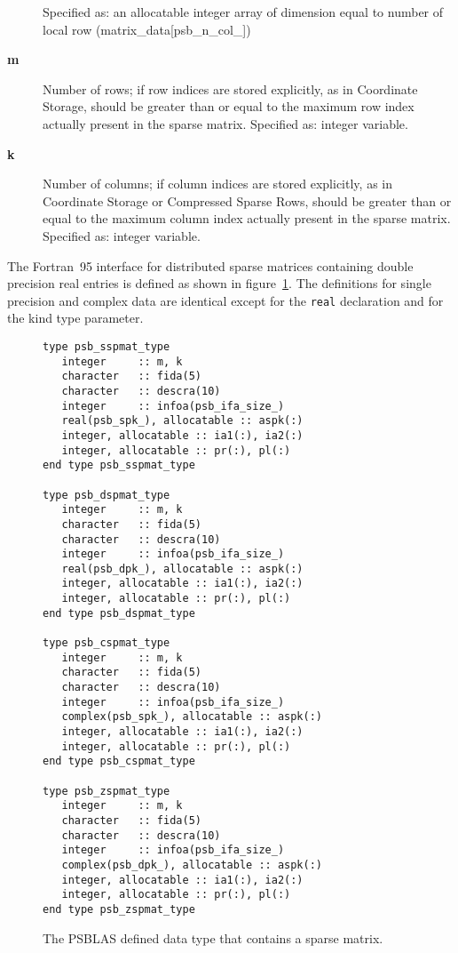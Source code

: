 \begin{description}
Specified as: an allocatable integer array of dimension equal to number of
local row (matrix\_data[psb\_n\_col\_\hbox{]})
\item[{\bf m}] Number of rows; if row indices are stored explicitly,
as in Coordinate Storage, should be greater than or equal to the
maximum row index actually present in the sparse matrix.
Specified as: integer variable.
\item[{\bf k}] Number of columns; if column indices are stored explicitly,
as in Coordinate Storage or Compressed Sparse Rows, should be greater
than or equal to the maximum column  index actually present in the sparse matrix.
Specified as: integer variable.
\end{description}
The Fortran~95 interface for distributed sparse matrices containing
double precision real entries is defined as shown in
figure~\ref{fig:spmattype}. The definitions for single precision and
complex data are identical except for the \verb|real| declaration and
for the kind type parameter.
\begin{figure}[h!]
  \begin{Sbox}
    \begin{minipage}[tl]{0.85\textwidth}
\begin{verbatim}
type psb_sspmat_type
   integer     :: m, k
   character   :: fida(5)
   character   :: descra(10)
   integer     :: infoa(psb_ifa_size_)
   real(psb_spk_), allocatable :: aspk(:)
   integer, allocatable :: ia1(:), ia2(:)
   integer, allocatable :: pr(:), pl(:)
end type psb_sspmat_type

type psb_dspmat_type
   integer     :: m, k
   character   :: fida(5)
   character   :: descra(10)
   integer     :: infoa(psb_ifa_size_)
   real(psb_dpk_), allocatable :: aspk(:)
   integer, allocatable :: ia1(:), ia2(:)
   integer, allocatable :: pr(:), pl(:)
end type psb_dspmat_type

type psb_cspmat_type
   integer     :: m, k
   character   :: fida(5)
   character   :: descra(10)
   integer     :: infoa(psb_ifa_size_)
   complex(psb_spk_), allocatable :: aspk(:)
   integer, allocatable :: ia1(:), ia2(:)
   integer, allocatable :: pr(:), pl(:)
end type psb_cspmat_type

type psb_zspmat_type
   integer     :: m, k
   character   :: fida(5)
   character   :: descra(10)
   integer     :: infoa(psb_ifa_size_)
   complex(psb_dpk_), allocatable :: aspk(:)
   integer, allocatable :: ia1(:), ia2(:)
   integer, allocatable :: pr(:), pl(:)
end type psb_zspmat_type

\end{verbatim}
    \end{minipage}
  \end{Sbox}
  \setlength{\fboxsep}{8pt}
  \begin{center}
    \fbox{\TheSbox}
  \end{center}
  \caption{\label{fig:spmattype} 
    The PSBLAS defined data type that
    contains a sparse matrix.} 
\end{figure}

